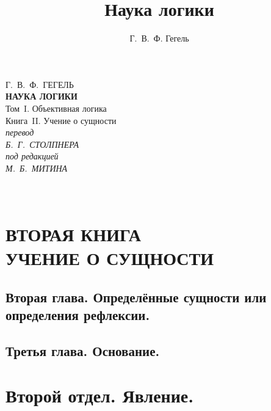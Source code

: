 \documentclass[b5paper, 11pt, twoside, onecolumn, openany]{memoir}
\author{Г.~В.~Ф. Гегель}
\title{Наука логики}
\date{}
\begin{document}
\frontmatter
\pagestyle{empty}

{\centering
  {\Large Г.~В.~Ф.~ГЕГЕЛЬ} \\
  \vspace{130pt}
  \textbf{\Huge НАУКА ЛОГИКИ} \\
  \vspace{60pt}
  {\Large Том~I. Объективная логика} \\
  \vspace{8pt}
  {\large Книга~II. Учение о сущности} \\
  \vspace{70pt}
  \textit{перевод} \\
  \textit{Б.~Г.~СТОЛПНЕРА} \\
  \vspace{10pt}
  \textit{под редакцией} \\
  \textit{М.~Б.~МИТИНА}
\par}

\clearpage

\mainmatter
\pagestyle{plain}


\part[\hspace{38mm}УЧЕНИЕ О СУЩНОСТИ]%
     {\ \\\vspace{200pt}\Large\mdseries ВТОРАЯ КНИГА \\
      \LARGE\bfseries УЧЕНИЕ О СУЩНОСТИ}
\thispagestyle{empty}
\clearpage


\chapter*{Вторая глава. Определённые сущности или определения рефлексии.}


\chapter*{Третья глава. Основание.}


\part*{Второй отдел. Явление.}
\end{document}
